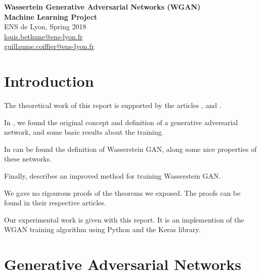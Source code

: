 \documentclass[a4paper]{article}
\theoremstyle{plain}
\theoremstyle{remark}
\theoremstyle{definition}
\begin{document}
\begin{titlepage}
\begin{center}
 {\Huge\bfseries Wassertein Generative Adversarial Networks (WGAN)\\}
 \vspace{2cm}
 {\Large \bfseries Machine Learning Project \\}
 \vspace{2cm}
 {\large ENS de Lyon, Spring 2018 \\}
 \vspace{2cm}
{\Large {} \color{black}
	\href{mailto:louis.bethune@ens-lyon.fr}{louis.bethune@ens-lyon.fr}\\
    \vspace{0.2cm}
	\href{mailto:guillaume.coiffier@ens-lyon.fr}{guillaume.coiffier@ens-lyon.fr}\\
}
\vspace{3cm}
\end{center}
\tableofcontents
\vfill
\end{titlepage}

\section*{Introduction}

The theoretical work of this report is supported by the articles \cite{goodfellow2014generative}, \cite{arjovsky2017wasserstein} and \cite{gulrajani2017improved}.

In \cite{goodfellow2014generative}, we found the original concept and definition of a generative adversarial network, and some basic results about the training.

In \cite{arjovsky2017wasserstein} can be found the definition of Wasserstein GAN, along some nice properties of these networks.

Finally, \cite{gulrajani2017improved} describes an improved method for training Wasserstein GAN.

We gave no rigourous proofs of the theorems we exposed. The proofs can be found in their respective articles.

Our experimental work is given with this report. It is an implemention of the WGAN training algorithm using Python and the Keras library.

\section{Generative Adversarial Networks}
\end{document}
